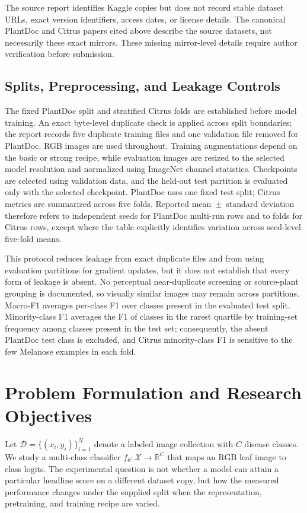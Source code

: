 \documentclass[conference]{IEEEtran}
\begin{document}

\DatasetTable

The source report identifies Kaggle copies but does not record stable dataset URLs, exact version identifiers, access dates, or license details. The canonical PlantDoc and Citrus papers cited above describe the source datasets, not necessarily these exact mirrors. These missing mirror-level details require author verification before submission.

\subsection{Splits, Preprocessing, and Leakage Controls}
The fixed PlantDoc split and stratified Citrus folds are established before model training. An exact byte-level duplicate check is applied across split boundaries; the report records five duplicate training files and one validation file removed for PlantDoc. RGB images are used throughout. Training augmentations depend on the basic or strong recipe, while evaluation images are resized to the selected model resolution and normalized using ImageNet channel statistics. Checkpoints are selected using validation data, and the held-out test partition is evaluated only with the selected checkpoint. PlantDoc uses one fixed test split; Citrus metrics are summarized across five folds. Reported mean~$\pm$~standard deviation therefore refers to independent seeds for PlantDoc multi-run rows and to folds for Citrus rows, except where the table explicitly identifies variation across seed-level five-fold means.

This protocol reduces leakage from exact duplicate files and from using evaluation partitions for gradient updates, but it does not establish that every form of leakage is absent. No perceptual near-duplicate screening or source-plant grouping is documented, so visually similar images may remain across partitions. Macro-F1 averages per-class F1 over classes present in the evaluated test split. Minority-class F1 averages the F1 of classes in the rarest quartile by training-set frequency among classes present in the test set; consequently, the absent PlantDoc test class is excluded, and Citrus minority-class F1 is sensitive to the few Melanose examples in each fold.

\section{Problem Formulation and Research Objectives}
Let $\mathcal{D}=\{(x_i,y_i)\}_{i=1}^{N}$ denote a labeled image collection with $C$ disease classes. We study a multi-class classifier $f_{\theta}:\mathcal{X}\rightarrow\mathbb{R}^{C}$ that maps an RGB leaf image to class logits. The experimental question is not whether a model can attain a particular headline score on a different dataset copy, but how the measured performance changes under the supplied split when the representation, pretraining, and training recipe are varied.
\end{document}
